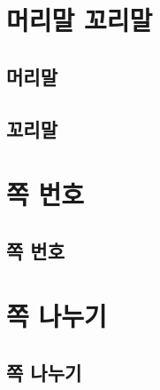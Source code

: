 \chapter{머리말 꼬리말}



\section{머리말}


\section{꼬리말}

	




\chapter{쪽 번호}
	
	\newpage
	\section{쪽 번호}
	
	
\chapter{쪽 나누기}
	

	
	\section{쪽 나누기}
	
